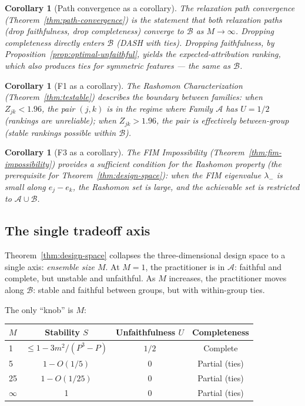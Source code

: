 \documentclass{article}
\newtheorem{corollary}[theorem]{Corollary}
\begin{document}
\begin{corollary}[Path convergence as a corollary]
The relaxation path convergence (Theorem~\ref{thm:path-convergence})
is the statement that \emph{both} relaxation paths (drop faithfulness,
drop completeness) converge to $\mathcal{B}$ as $M \to \infty$.
Dropping completeness directly enters $\mathcal{B}$ (DASH with ties).
Dropping faithfulness, by Proposition~\ref{prop:optimal-unfaithful},
yields the expected-attribution ranking, which also produces ties
for symmetric features --- the same as $\mathcal{B}$.
\end{corollary}

\begin{corollary}[F1 as a corollary]
The Rashomon Characterization (Theorem~\ref{thm:testable}) describes
the \emph{boundary between families}: when $Z_{jk} < 1.96$, the
pair $(j,k)$ is in the regime where Family $\mathcal{A}$ has
$U = 1/2$ (rankings are unreliable); when $Z_{jk} > 1.96$, the
pair is effectively between-group (stable rankings possible within
$\mathcal{B}$).
\end{corollary}

\begin{corollary}[F3 as a corollary]
The FIM Impossibility (Theorem~\ref{thm:fim-impossibility}) provides
a sufficient condition for the Rashomon property (the prerequisite
for Theorem~\ref{thm:design-space}): when the FIM eigenvalue
$\lambda_-$ is small along $e_j - e_k$, the Rashomon set is large,
and the achievable set is restricted to $\mathcal{A} \cup \mathcal{B}$.
\end{corollary}

\subsection{The single tradeoff axis}

Theorem~\ref{thm:design-space} collapses the three-dimensional
design space to a single axis: \emph{ensemble size $M$}.
At $M = 1$, the practitioner is in $\mathcal{A}$: faithful and
complete, but unstable and unfaithful. As $M$ increases, the
practitioner moves along $\mathcal{B}$: stable and faithful
between groups, but with within-group ties.

The only ``knob'' is $M$:
\begin{center}
\small
\begin{tabular}{@{}lccc@{}}
\toprule
$M$ & Stability $S$ & Unfaithfulness $U$ & Completeness \\
\midrule
1 & $\leq 1 - 3m^2/(P^3{-}P)$ & $1/2$ & Complete \\
5 & $1 - O(1/5)$ & 0 & Partial (ties) \\
25 & $1 - O(1/25)$ & 0 & Partial (ties) \\
$\infty$ & 1 & 0 & Partial (ties) \\
\bottomrule
\end{tabular}
\end{center}
\end{document}
